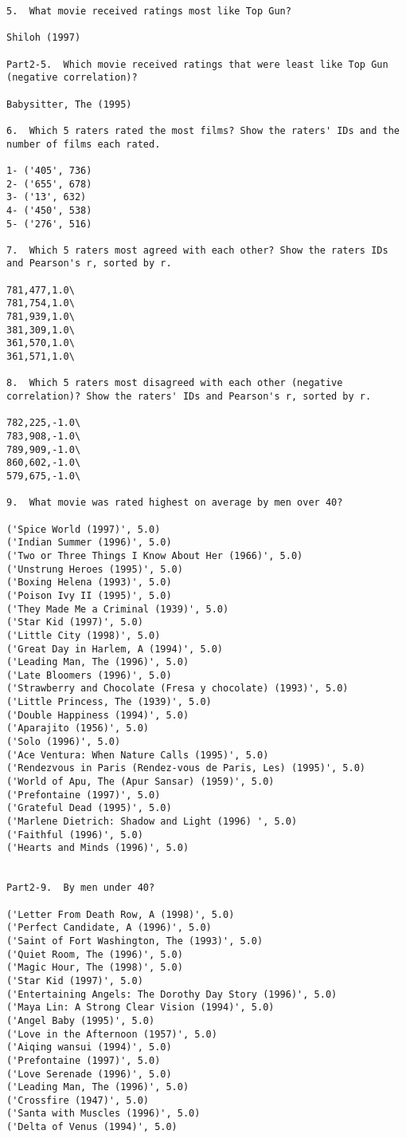 \documentclass[letterpaper,11pt]{article}
\begin{document}
\begin{lstlisting}
5.  What movie received ratings most like Top Gun?

Shiloh (1997)

Part2-5.  Which movie received ratings that were least like Top Gun (negative correlation)?

Babysitter, The (1995)

6.  Which 5 raters rated the most films? Show the raters' IDs and the number of films each rated.

1- ('405', 736)
2- ('655', 678)
3- ('13', 632)
4- ('450', 538)
5- ('276', 516)

7.  Which 5 raters most agreed with each other? Show the raters IDs and Pearson's r, sorted by r.

781,477,1.0\
781,754,1.0\
781,939,1.0\
381,309,1.0\
361,570,1.0\
361,571,1.0\

8.  Which 5 raters most disagreed with each other (negative correlation)? Show the raters' IDs and Pearson's r, sorted by r.

782,225,-1.0\
783,908,-1.0\
789,909,-1.0\
860,602,-1.0\
579,675,-1.0\

9.  What movie was rated highest on average by men over 40?

('Spice World (1997)', 5.0)
('Indian Summer (1996)', 5.0)
('Two or Three Things I Know About Her (1966)', 5.0)
('Unstrung Heroes (1995)', 5.0)
('Boxing Helena (1993)', 5.0)
('Poison Ivy II (1995)', 5.0)
('They Made Me a Criminal (1939)', 5.0)
('Star Kid (1997)', 5.0)
('Little City (1998)', 5.0)
('Great Day in Harlem, A (1994)', 5.0)
('Leading Man, The (1996)', 5.0)
('Late Bloomers (1996)', 5.0)
('Strawberry and Chocolate (Fresa y chocolate) (1993)', 5.0)
('Little Princess, The (1939)', 5.0)
('Double Happiness (1994)', 5.0)
('Aparajito (1956)', 5.0)
('Solo (1996)', 5.0)
('Ace Ventura: When Nature Calls (1995)', 5.0)
('Rendezvous in Paris (Rendez-vous de Paris, Les) (1995)', 5.0)
('World of Apu, The (Apur Sansar) (1959)', 5.0)
('Prefontaine (1997)', 5.0)
('Grateful Dead (1995)', 5.0)
('Marlene Dietrich: Shadow and Light (1996) ', 5.0)
('Faithful (1996)', 5.0)
('Hearts and Minds (1996)', 5.0)


Part2-9.  By men under 40?

('Letter From Death Row, A (1998)', 5.0)
('Perfect Candidate, A (1996)', 5.0)
('Saint of Fort Washington, The (1993)', 5.0)
('Quiet Room, The (1996)', 5.0)
('Magic Hour, The (1998)', 5.0)
('Star Kid (1997)', 5.0)
('Entertaining Angels: The Dorothy Day Story (1996)', 5.0)
('Maya Lin: A Strong Clear Vision (1994)', 5.0)
('Angel Baby (1995)', 5.0)
('Love in the Afternoon (1957)', 5.0)
('Aiqing wansui (1994)', 5.0)
('Prefontaine (1997)', 5.0)
('Love Serenade (1996)', 5.0)
('Leading Man, The (1996)', 5.0)
('Crossfire (1947)', 5.0)
('Santa with Muscles (1996)', 5.0)
('Delta of Venus (1994)', 5.0)



\end{lstlisting}
\end{document}
